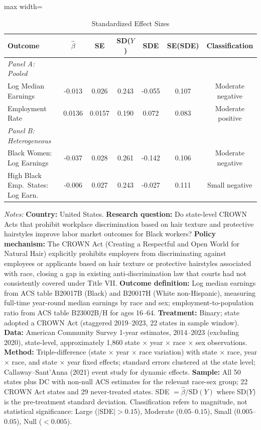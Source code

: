 \begin{table}[htbp]
\centering
\caption{Standardized Effect Sizes}
\label{tab:sde}
\footnotesize
\begin{adjustbox}{max width=\textwidth}
\begin{tabular}{lcccccc}
\toprule
Outcome & $\hat{\beta}$ & SE & SD($Y$) & SDE & SE(SDE) & Classification \\
\midrule
\textit{Panel A: Pooled} & & & & & & \\
Log Median Earnings & -0.013 & 0.026 & 0.243 & -0.055 & 0.107 & Moderate negative \\
Employment Rate & 0.0136 & 0.0157 & 0.190 & 0.072 & 0.083 & Moderate positive \\
\midrule
\textit{Panel B: Heterogeneous} & & & & & & \\
Black Women: Log Earnings & -0.037 & 0.028 & 0.261 & -0.142 & 0.106 & Moderate negative \\
High Black Emp.\ States: Log Earn.\ & -0.006 & 0.027 & 0.243 & -0.027 & 0.111 & Small negative \\
\bottomrule
\end{tabular}
\end{adjustbox}
\begin{tablenotes}
\item \textit{Notes:} \textbf{Country:} United States. \textbf{Research question:} Do state-level CROWN Acts that prohibit workplace discrimination based on hair texture and protective hairstyles improve labor market outcomes for Black workers? \textbf{Policy mechanism:} The CROWN Act (Creating a Respectful and Open World for Natural Hair) explicitly prohibits employers from discriminating against employees or applicants based on hair texture or protective hairstyles associated with race, closing a gap in existing anti-discrimination law that courts had not consistently covered under Title VII. \textbf{Outcome definition:} Log median earnings from ACS table B20017B (Black) and B20017H (White non-Hispanic), measuring full-time year-round median earnings by race and sex; employment-to-population ratio from ACS table B23002B/H for ages 16--64. \textbf{Treatment:} Binary; state adopted a CROWN Act (staggered 2019--2023, 22 states in sample window). \textbf{Data:} American Community Survey 1-year estimates, 2014--2023 (excluding 2020), state-level, approximately 1,860 state $\times$ year $\times$ race $\times$ sex observations. \textbf{Method:} Triple-difference (state $\times$ year $\times$ race variation) with state $\times$ race, year $\times$ race, and state $\times$ year fixed effects; standard errors clustered at the state level; Callaway--Sant'Anna (2021) event study for dynamic effects. \textbf{Sample:} All 50 states plus DC with non-null ACS estimates for the relevant race-sex group; 22 CROWN Act states and 29 never-treated states. SDE $= \hat{\beta} / \text{SD}(Y)$ where SD($Y$) is the pre-treatment standard deviation. Classification refers to magnitude, not statistical significance: Large ($|$SDE$| > 0.15$), Moderate ($0.05$--$0.15$), Small ($0.005$--$0.05$), Null ($< 0.005$).
\end{tablenotes}
\end{table}
